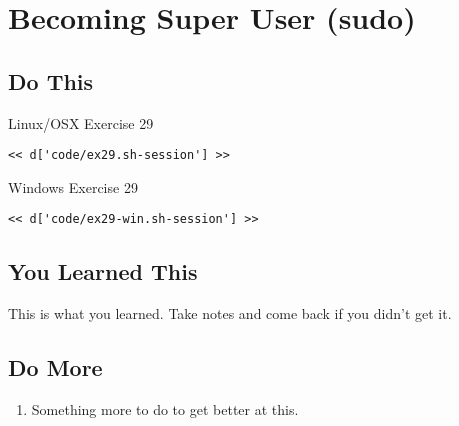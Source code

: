 \chapter{Becoming Super User (sudo)}

\section{Do This}

\begin{code}{Linux/OSX Exercise 29}
\begin{Verbatim}
<< d['code/ex29.sh-session'] >>
\end{Verbatim}
\end{code}

\begin{code}{Windows Exercise 29}
\begin{Verbatim}
<< d['code/ex29-win.sh-session'] >>
\end{Verbatim}
\end{code}

\section{You Learned This}

This is what you learned.  Take notes and come back if you didn't get it.

\section{Do More}

\begin{enumerate}
\item Something more to do to get better at this.
\end{enumerate}


